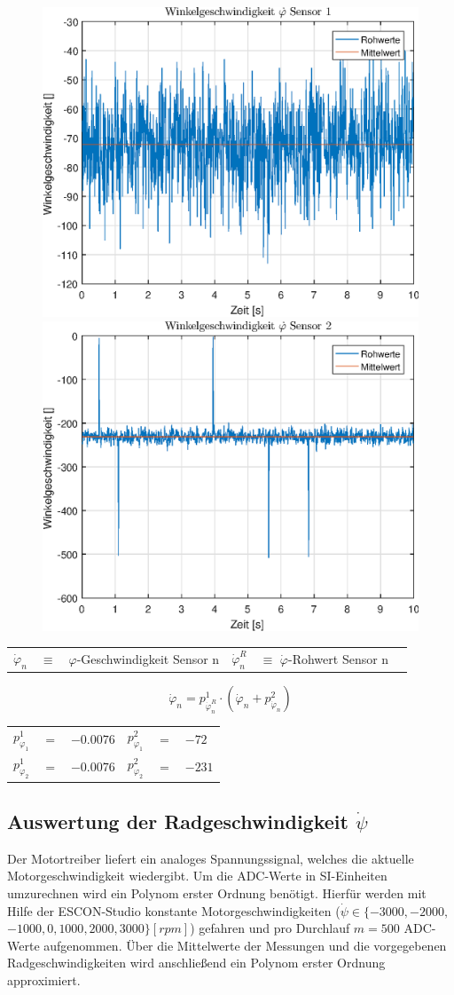 \begin{figure}[h]
	\includegraphics[width=0.5\linewidth]{img/phi1__d.eps}
	\includegraphics[width=0.5\linewidth]{img/phi2__d.eps}
\end{figure}

\begin{table}[h]
\centering
\begin{tabular}{lcllcl}
$\dot{\varphi}_n$ & $\equiv$ & $\varphi$-Geschwindigkeit Sensor n & $\dot{\varphi}^R_n$ & $\equiv$ $\dot{\varphi}$-Rohwert Sensor n
\end{tabular}
\end{table}

\begin{equation}
\dot{\varphi}_n = p^1_{\dot{\varphi}^R_n}  \cdot (\dot{\varphi}_n + p^2_{\dot{\varphi}_n})
\end{equation}

\begin{table}[h]
\centering
\begin{tabular}{lcllcl}
$p^1_{\varphi_1}$ &$=$& $-0.0076$ & $p^2_{\varphi_1}$ &$=$& $-72$ \\
$p^1_{\varphi_2}$ &$=$& $-0.0076$ & $p^2_{\varphi_2}$ &$=$& $-231$ \\
\end{tabular}
\end{table}

\subsection{Auswertung der Radgeschwindigkeit $\dot{\psi}$}
Der Motortreiber liefert ein analoges Spannungssignal, welches die aktuelle Motorgeschwindigkeit wiedergibt. Um die ADC-Werte in SI-Einheiten umzurechnen wird ein Polynom erster Ordnung benötigt. Hierfür werden mit Hilfe der ESCON-Studio konstante Motorgeschwindigkeiten ($\dot{\psi} \in \{ -3000, -2000,$  $-1000, 0, 1000, 2000, 3000 \} [rpm] $) gefahren und pro Durchlauf $m=500$ ADC-Werte aufgenommen. Über die Mittelwerte der Messungen und die vorgegebenen Radgeschwindigkeiten wird anschließend ein Polynom erster Ordnung approximiert.

